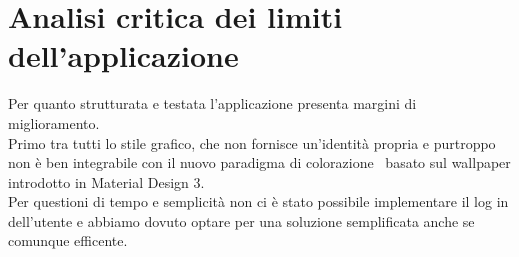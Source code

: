 \documentclass[../Assignment-3-LPSMT.tex]{subfiles}
\begin{document}
\chapter{Analisi critica dei limiti dell’applicazione}

Per quanto strutturata e testata l'applicazione presenta margini di miglioramento.\\
Primo tra tutti lo stile grafico, che non fornisce un'identità propria e purtroppo non è ben integrabile con il nuovo paradigma di colorazione~\cite{matDesColor} basato sul wallpaper introdotto in Material Design 3.\\
Per questioni di tempo e semplicità non ci è stato possibile implementare il log in dell'utente e abbiamo dovuto optare per una soluzione semplificata anche se comunque efficente.
\end{document}

